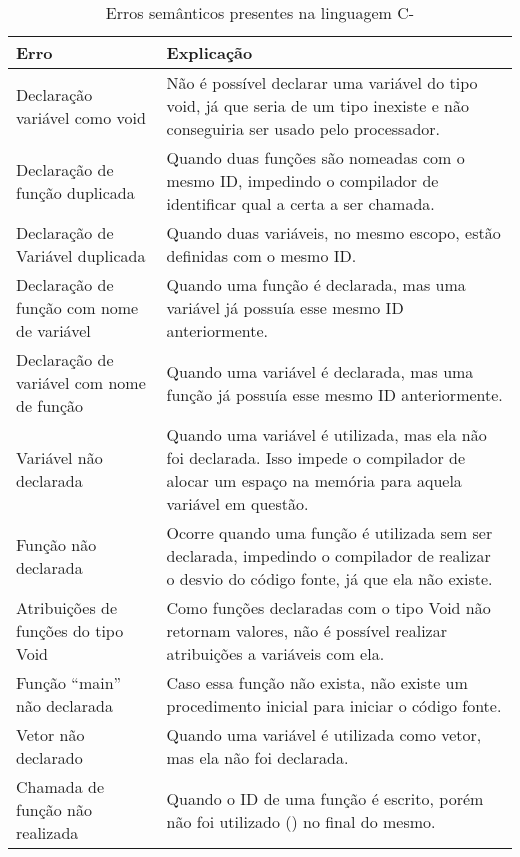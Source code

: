 \documentclass[
	12pt,				%
	oneside,
	a4paper,			%
	english,			%
	french,				%
	spanish,			%
	brazil,				%
	]{abntex2}
\begin{document}
\begin{table}[H]
\centering
\ABNTEXfontereduzida
\caption{Erros semânticos presentes na linguagem C-} \label{tab:Semantico}
\begin{tabular}{||m{6cm} | |m{9cm}||} 
 \hline
\multicolumn{1}{||m{6cm}||}{\centering Erro} & \multicolumn{1}{m{9cm}||}{\centering Explicação}\\ [0.5ex] 
 \hline
 Declaração variável como void & Não é possível declarar uma variável do tipo void, já que seria de um tipo inexiste e não conseguiria ser usado pelo processador. \\ 
 \hline
 Declaração de função duplicada & Quando duas funções são nomeadas com o mesmo ID, impedindo o compilador de identificar qual a certa a ser chamada.  \\
 \hline
 Declaração de Variável duplicada & Quando duas variáveis, no mesmo escopo, estão definidas com o mesmo ID. \\
 \hline
 Declaração de função com nome de variável & Quando uma função é declarada, mas uma variável já possuía esse mesmo ID anteriormente. \\
 \hline
 Declaração de variável com nome de função & Quando uma variável é declarada, mas uma função já possuía esse mesmo ID anteriormente. \\
 \hline
 Variável não declarada & Quando uma variável é utilizada, mas ela não foi declarada. Isso impede o compilador de alocar um espaço na memória para aquela variável em questão. \\
 \hline
 Função não declarada & Ocorre quando uma função é utilizada sem ser declarada, impedindo o compilador de realizar o desvio do código fonte, já que ela não existe. \\
 \hline
 Atribuições de funções do tipo Void & Como funções declaradas com o tipo Void não retornam valores, não é possível realizar atribuições a variáveis com ela.\\
 \hline
 Função ``main'' não declarada & Caso essa função não exista, não existe um procedimento inicial para iniciar o código fonte. \\ 
 \hline
 Vetor não declarado & Quando uma variável é utilizada como vetor, mas ela não foi declarada.\\
 \hline
 Chamada de função não realizada & Quando o ID de uma função é escrito, porém não foi utilizado () no final do mesmo.\\
 \hline
\end{tabular}
\end{table}
\end{document}
